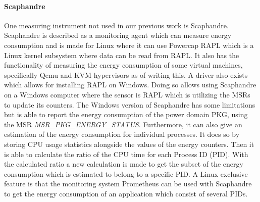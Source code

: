 \paragraph{Scaphandre}
One measuring instrument not used in our previous work is Scaphandre\cite{scaphandre}. Scaphandre is described as a monitoring agent which can measure energy consumption and is made for Linux where it can use Powercap RAPL which is a Linux kernel subsystem where data can be read from RAPL. It also has the functionality of measuring the energy consumption of some virtual machines, specifically Qemu and KVM hypervisors as of writing this. A driver also exists which allows for installing RAPL on Windows.\cite{RAPL_Windows} Doing so allows using Scaphandre on a Windows computer where the sensor is RAPL which is utilizing the MSRs to update its counters. The Windows version of Scaphandre has some limitations but is able to report the energy consumption of the power domain PKG, using the MSR \textit{MSR\_PKG\_ENERGY\_STATUS}. Furthermore, it can also give an estimation of the energy consumption for individual processes. It does so by storing CPU usage statistics alongside the values of the energy counters. Then it is able to calculate the ratio of the CPU time for each Process ID (PID). With the calculated ratio a new calculation is made to get the subset of the energy consumption which is estimated to belong to a specific PID. A Linux exclusive feature is that the monitoring system Prometheus can be used with Scaphandre to get the energy consumption of an application which consist of several PIDs.